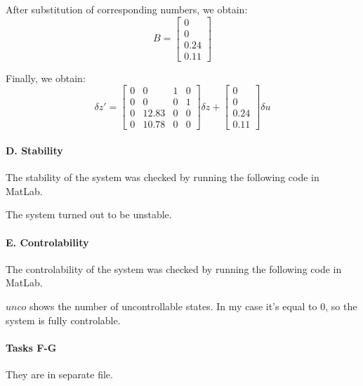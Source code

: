 \documentclass{article}
\begin{document}
   After substitution of corresponding numbers, we obtain:
   $$
   B = 
   \begin{bmatrix}
    0 \\
    0 \\
    0.24 \\
    0.11
    \end{bmatrix}
   $$
   
   Finally, we obtain: 
   $$
   \delta z' = 
   \begin{bmatrix}
    0 & 0 & 1 & 0 \\
    0 & 0 & 0 & 1 \\
    0 & 12.83 & 0 & 0 \\
    0 & 10.78 & 0 & 0
    \end{bmatrix} \delta z
    +
    \begin{bmatrix}
    0 \\
    0 \\
    0.24 \\
    0.11
    \end{bmatrix} \delta u
   $$
   
   \paragraph{D. Stability}
    
   \leavevmode
    
   \noindent
   The stability of the system was checked by running the following code in MatLab.
   
   
   
   The system turned out to be unstable.
   
  \newpage
   
   \paragraph{E. Controlability}
    
   \leavevmode
    
   \noindent
   The controlability of the system was checked by running the following code in MatLab.
   
   
   
   \bigbreak
   \noindent
   $unco$ shows the number of uncontrollable states. In my case it's equal to 0, so the system is fully controlable.
   
   
   
   \paragraph{Tasks F-G}
   \leavevmode
    
   \noindent
   They are in separate file.
   
  
    
\end{document}
